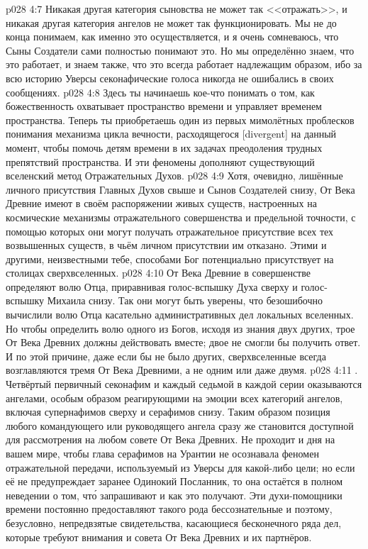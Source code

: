 \vs p028 4:7 Никакая другая категория сыновства не может так <<отражать>>, и никакая другая категория ангелов не может так функционировать. Мы не до конца понимаем, как именно это осуществляется, и я очень сомневаюсь, что Сыны Создатели сами полностью понимают это. Но мы определённо знаем, что это работает, и знаем также, что это всегда работает надлежащим образом, ибо за всю историю Уверсы секонафические голоса никогда не ошибались в своих сообщениях.
\vs p028 4:8 Здесь ты начинаешь кое\hyp{}что понимать о том, как божественность охватывает пространство времени и управляет временем пространства. Теперь ты приобретаешь один из первых мимолётных проблесков понимания механизма цикла вечности, расходящегося [divergent] на данный момент, чтобы помочь детям времени в их задачах преодоления трудных препятствий пространства. И эти феномены дополняют существующий вселенский метод Отражательных Духов.
\vs p028 4:9 Хотя, очевидно, лишённые личного присутствия Главных Духов свыше и Сынов Создателей снизу, От Века Древние имеют в своём распоряжении живых существ, настроенных на космические механизмы отражательного совершенства и предельной точности, с помощью которых они могут получать отражательное присутствие всех тех возвышенных существ, в чьём личном присутствии им отказано. Этими и другими, неизвестными тебе, способами Бог потенциально присутствует на столицах сверхвселенных.
\vs p028 4:10 От Века Древние в совершенстве определяют волю Отца, приравнивая голос\hyp{}вспышку Духа сверху и голос\hyp{}вспышку Михаила снизу. Так они могут быть уверены, что безошибочно вычислили волю Отца касательно административных дел локальных вселенных. Но чтобы определить волю одного из Богов, исходя из знания двух других, трое От Века Древних должны действовать вместе; двое не смогли бы получить ответ. И по этой причине, даже если бы не было других, сверхвселенные всегда возглавляются тремя От Века Древними, а не одним или даже двумя.
\vs p028 4:11 . Четвёртый первичный секонафим и каждый седьмой в каждой серии оказываются ангелами, особым образом реагирующими на эмоции всех категорий ангелов, включая супернафимов сверху и серафимов снизу. Таким образом позиция любого командующего или руководящего ангела сразу же становится доступной для рассмотрения на любом совете От Века Древних. Не проходит и дня на вашем мире, чтобы глава серафимов на Урантии не осознавала феномен отражательной передачи, используемый из Уверсы для какой\hyp{}либо цели; но если её не предупреждает заранее Одинокий Посланник, то она остаётся в полном неведении о том, чт\'о запрашивают и как это получают. Эти духи\hyp{}помощники времени постоянно предоставляют такого рода бессознательные и поэтому, безусловно, непредвзятые свидетельства, касающиеся бесконечного ряда дел, которые требуют внимания и совета От Века Древних и их партнёров.
